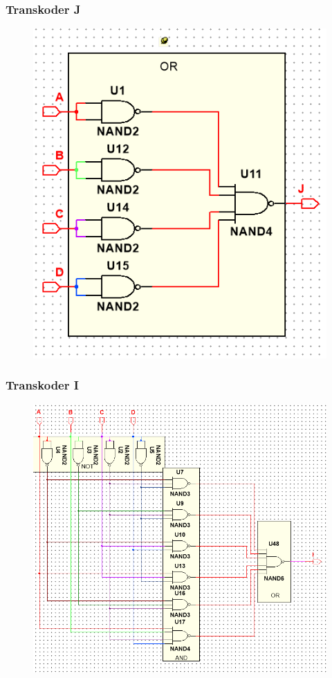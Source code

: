 \documentclass[a4paper]{article}
\begin{document}
\subsubsection{Transkoder J}
 \begin{figure}[H]
  \centering
  \includegraphics{schemat_J.png}
\end{figure}

\subsubsection{Transkoder I}
\begin{figure}[H]
 \centering
 \includegraphics{schemat_I.png}
\end{figure}
\end{document}

